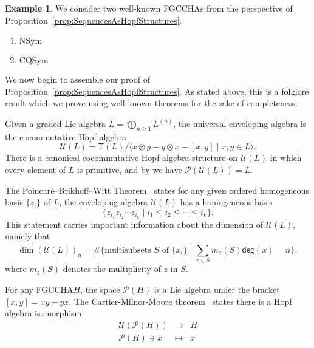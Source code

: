 \documentclass[11pt]{amsart}
\theoremstyle{definition}
\newtheorem{example}[theorem]{Example}
\numberwithin{equation}{section}
\newcommand{\FGCCHA}{\textsf{FGCCHA}\xspace}
\newcommand{\FGCCHAs}{\textsf{FGCCHA}s\xspace}
\newcommand{\vecdim}{\overrightarrow{\dim}}
\begin{document}
\begin{example}
We consider two well-known \FGCCHAs from the perspective of Proposition~\ref{prop:SequencesAsHopfStructures}.
\begin{enumerate}
\item $\mathrm{NSym}$

\item $\mathrm{CQSym}$

\end{enumerate}
\end{example}

We now begin to assemble our proof of Proposition~\ref{prop:SequencesAsHopfStructures}.  
As stated above, this is a folklore result which we prove using well-known theorems for the sake of completeness.  

Given a graded Lie algebra $L = \bigoplus_{n \ge 1} L^{(n)}$, the universal enveloping algebra is the cocommutative Hopf algebra
\[
\mathcal{U}(L) = \mathsf{T}(L) \big/ \big\langle x\otimes y - y \otimes x - [x, y] \;|\; \text{$x, y \in L$} \big\rangle.
\]
There is a canonical cocommutative Hopf algebra structure on $\mathcal{U}(L)$ in which every element of $L$ is primitive, and by \cite[Theorem 1.4]{Reutenauer-FreeLieAlgebras} we have $\mathcal{P}(\mathcal{U}(L))=L$.  

The Poincar\'{e}--Brikhoff--Witt Theorem~\cite[??]{Reutenauer-FreeLieAlgebras} states for any given ordered homogeneous basis $\{z_i\}$ of $L$, the enveloping algebra $\mathcal{U}(L)$ has a homogeneous basis 
\[
\{ z_{i_1}z_{i_2}\cdots z_{i_k} \;|\; i_1 \leq i_2 \leq \cdots \leq i_k\}.
\]
This statement carries important information about the dimension of $\mathcal{U}(L)$, namely that 
\[
\vecdim(\mathcal{U}(L))_{n}= \#\{\text{multisubsets $S$ of $\{x_{i}\}$} \;|\; \sum_{z \in S} m_{z}(S) \mathsf{deg}(x) = n\},
\]
where $m_{z}(S)$ denotes the multiplicity of $z$ in $S$.

For any \FGCCHA $H$, the space $\mathcal{P}(H)$ is a Lie algebra under the bracket $[x, y] = xy - yx$.  
The Cartier-Milnor-Moore theorem~\cite[see Theorem 5.18]{MM65} states there is a Hopf algebra isomorphism 
\[
\begin{array}{rcl}
\mathcal{U}(\mathcal{P}(H)) &\to& H \\
\mathcal{P}(H) \ni x & \mapsto&  x
\end{array}
\]
\end{document}
